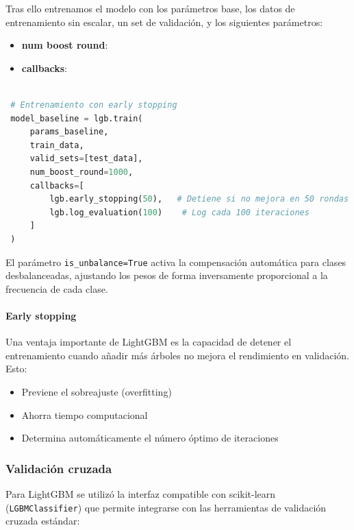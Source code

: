 Tras ello entrenamos el modelo con los parámetros base, los datos de entrenamiento sin escalar, un set de validación, y los siguientes parámetros:

\begin{itemize}
	\item \textbf{num boost round}:
	\item \textbf{callbacks}: 
\end{itemize}

\begin{lstlisting}[language=Python, caption=Configuración del modelo baseline LightGBM]

 # Entrenamiento con early stopping
 model_baseline = lgb.train(
     params_baseline,
     train_data,
     valid_sets=[test_data],
     num_boost_round=1000,
     callbacks=[
         lgb.early_stopping(50),   # Detiene si no mejora en 50 rondas
         lgb.log_evaluation(100)    # Log cada 100 iteraciones
     ]
 )
\end{lstlisting}

El parámetro \texttt{is\_unbalance=True} activa la compensación automática para clases desbalanceadas, ajustando los pesos de forma inversamente proporcional a la frecuencia de cada clase.

\paragraph{Early stopping}
Una ventaja importante de LightGBM es la capacidad de detener el entrenamiento cuando añadir más árboles no mejora el rendimiento en validación. Esto:
\begin{itemize}
    \item Previene el sobreajuste (overfitting)
    \item Ahorra tiempo computacional
    \item Determina automáticamente el número óptimo de iteraciones
\end{itemize}

\subsubsection*{Validación cruzada}

Para LightGBM se utilizó la interfaz compatible con scikit-learn (\texttt{LGBMClassifier}) que permite integrarse con las herramientas de validación cruzada estándar:

